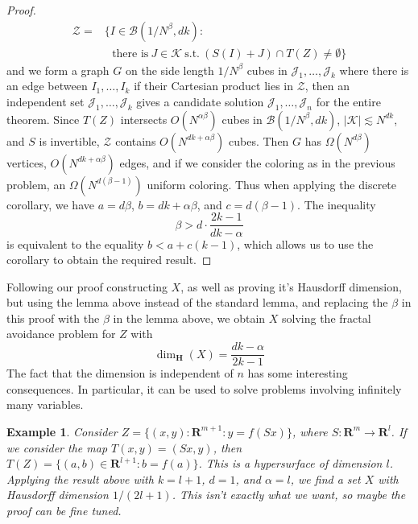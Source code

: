 \documentclass{article}
\theoremstyle{plain}
\newtheorem*{example}{Example}
\theoremstyle{plain}
\newtheorem{theorem}{Theorem}
\begin{document}
\begin{multicols}{2}
\begin{proof}
	\begin{align*}
		\mathcal{Z} = &\{ I \in \mathcal{B}(1/N^\beta,dk):\\
		&\ \ \ \text{there is}\ J \in \mathcal{K}\ \text{s.t.}\ (S(I) + J) \cap T(Z) \neq \emptyset \}
	\end{align*}
	and we form a graph $G$ on the side length $1/N^\beta$ cubes in $\mathcal{J}_1, \dots, \mathcal{J}_k$ where there is an edge between $I_1, \dots, I_k$ if their Cartesian product lies in $\mathcal{Z}$, then an independent set $\mathcal{J}_1, \dots, \mathcal{J}_k$ gives a candidate solution $\mathcal{J}_1, \dots, \mathcal{J}_n$ for the entire theorem. Since $T(Z)$ intersects $O(N^{\alpha \beta})$ cubes in $\mathcal{B}(1/N^\beta,dk)$, $|\mathcal{K}| \lesssim N^{dk}$, and $S$ is invertible, $\mathcal{Z}$ contains $O(N^{dk + \alpha \beta})$ cubes. Then $G$ has $\Omega(N^{d \beta})$ vertices, $O(N^{dk + \alpha \beta})$ edges, and if we consider the coloring as in the previous problem, an $\Omega(N^{d(\beta - 1)})$ uniform coloring. Thus when applying the discrete corollary, we have $a = d \beta$, $b = dk + \alpha \beta$, and $c = d(\beta - 1)$. The inequality
	\[ \beta > d \cdot \frac{2k - 1}{dk - \alpha} \]
	is equivalent to the equality $b < a + c(k-1)$, which allows us to use the corollary to obtain the required result.
\end{proof}

Following our proof constructing $X$, as well as proving it's Hausdorff dimension, but using the lemma above instead of the standard lemma, and replacing the $\beta$ in this proof with the $\beta$ in the lemma above, we obtain $X$ solving the fractal avoidance problem for $Z$ with
%
\[ \dim_{\mathbf{H}}(X) = \frac{dk - \alpha}{2k - 1} \]
%
The fact that the dimension is independent of $n$ has some interesting consequences. In particular, it can be used to solve problems involving infinitely many variables.

\begin{example}
	Consider $Z = \{ (x,y): \mathbf{R}^{m+1}: y = f(Sx) \}$, where $S: \mathbf{R}^m \to \mathbf{R}^l$. If we consider the map $T(x,y) = (Sx,y)$, then $T(Z) = \{ (a,b) \in \mathbf{R}^{l+1}: b = f(a) \}$. This is a hypersurface of dimension $l$. Applying the result above with $k = l+1$, $d = 1$, and $\alpha = l$, we find a set $X$ with Hausdorff dimension $1/(2l + 1)$. This isn't exactly what we want, so maybe the proof can be fine tuned.
\end{example}



\end{multicols}
\end{document}
